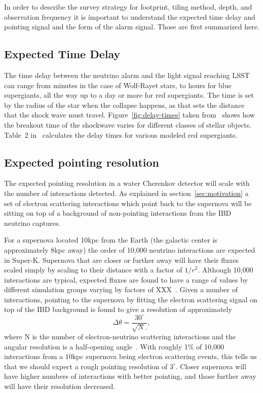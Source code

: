 \documentclass[11pt, letterpaper]{article}
\newcommand{\superk}  {Super\nobreakdash-K\xspace}
\begin{document}
In order to describe the survey strategy for footprint, tiling method,
depth, and observation frequency it is important to understand the
expected time delay and pointing signal and the form of the alarm
signal.  Those are first summarized here.

\subsection{Expected Time Delay}

The time delay between the neutrino alarm and the light signal
reaching LSST can range from minutes in the case of Wolf-Rayet stars,
to hours for blue supergiants, all the way up to a day or more for red
supergiants.  The time is set by the radius of the star when the
collapse happens, as that sets the distance that the shock wave must
travel.  Figure~\ref{fig:delay-times} taken
from~\cite{2013ApJ...778...81K} shows how the breakout time of the
shockwave varies for different classes of stellar objects. Table~2
in~\cite{2015ApJ...814...63M}  calculates the delay times for various
modeled red supergiants.

\subsection{Expected pointing resolution}

The expected pointing resolution in a water Cherenkov detector will
scale with the number of interactions detected.  As explained in
section~\ref{sec:motivation} a set of electron scattering interactions which
point back to the supernova will be sitting on top of a background of
non-pointing interactions from the IBD neutrino captures.

For a supernova located 10kpc from the Earth (the galactic center is
approximately 8kpc away) the order of 10,000 neutrino interactions are
expected in \superk.  Supernova that are closer or further away will
have their fluxes scaled simply by scaling to their distance with a
factor of $1/r^2$.  Although 10,000 interactions are typical, expected
fluxes are found to have a range of values by different simulation
groups varying by factors of XXX~\cite{model_references}.  Given a
number of interactions, pointing to the supernova by fitting the
electron scattering signal on top of the IBD background is found to
give a resolution of approximately
%
$$ \Delta \theta = \frac{30^\circ}{\sqrt{N}.}, $$
%
where N is the number of electron-neutrino scattering interactions and
the angular resolution is a half-opening
angle~\cite{2012ARNPS..62...81S}.  With roughly 1\% of 10,000
interactions from a 10kpc supernova being electron scattering events,
this tells us that we should expect a rough pointing resolution of
$3^\circ$.  Closer supernova will have higher numbers of interactions
with better pointing, and those further away will have their
resolution decreased.
\end{document}
